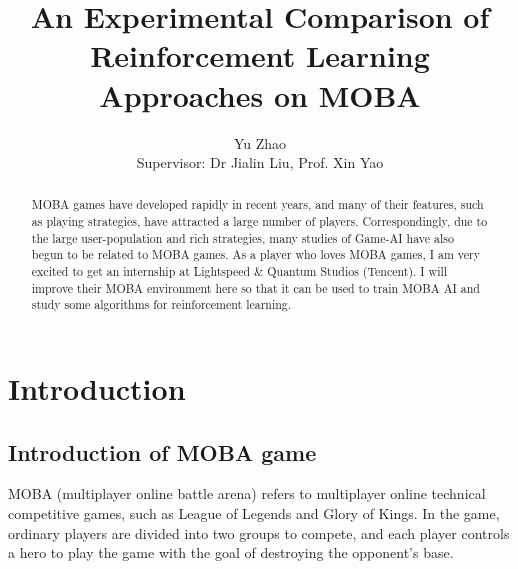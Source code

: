 \documentclass[runningheads]{llncs}
\begin{document}
%

\title{An Experimental Comparison of Reinforcement Learning Approaches on MOBA\\
} 
%
%
\author{Yu Zhao\\
Supervisor: Dr Jialin Liu, Prof. Xin Yao}

%
%

%
\maketitle              %
%
\begin{abstract}
  {MOBA games have developed rapidly in recent years, and many of their features, such as playing strategies, have attracted a large number of players. Correspondingly, due to the large user-population and rich strategies, many studies of Game-AI have also begun to be related to MOBA games. As a player who loves MOBA games, I am very excited to get an internship at Lightspeed \& Quantum Studios (Tencent). I will improve their MOBA environment here so that it can be used to train MOBA AI and study some algorithms for reinforcement learning.}

\end{abstract}
%
%
%
\section{Introduction}
\subsection{Introduction of MOBA game}
\qquad MOBA (multiplayer online battle arena) refers to multiplayer online technical competitive games, such as League of Legends and Glory of Kings. In the game, ordinary players are divided into two groups to compete, and each player controls a hero to play the game with the goal of destroying the opponent's base.
\end{document}
